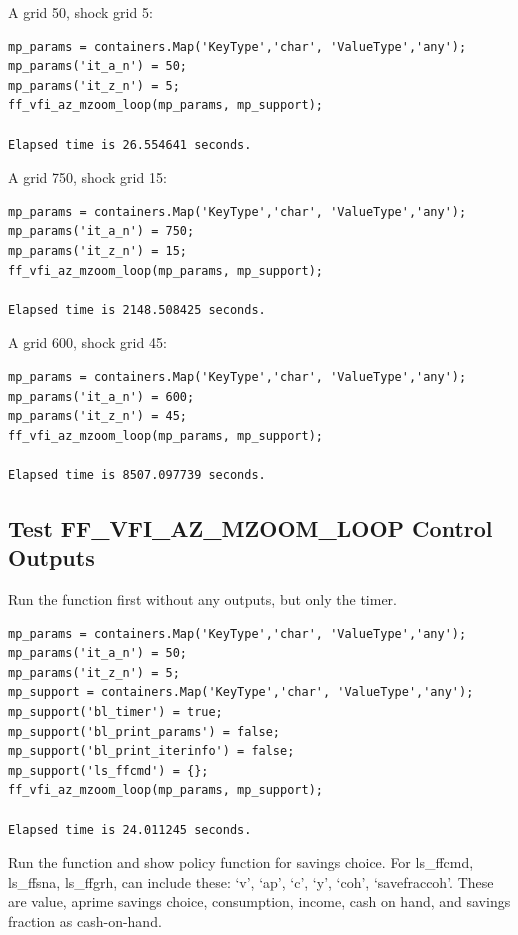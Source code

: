 \documentclass[
]{book}
\begin{document}
A grid 50, shock grid 5:

\begin{verbatim}
mp_params = containers.Map('KeyType','char', 'ValueType','any');
mp_params('it_a_n') = 50;
mp_params('it_z_n') = 5;
ff_vfi_az_mzoom_loop(mp_params, mp_support);

Elapsed time is 26.554641 seconds.
\end{verbatim}

A grid 750, shock grid 15:

\begin{verbatim}
mp_params = containers.Map('KeyType','char', 'ValueType','any');
mp_params('it_a_n') = 750;
mp_params('it_z_n') = 15;
ff_vfi_az_mzoom_loop(mp_params, mp_support);

Elapsed time is 2148.508425 seconds.
\end{verbatim}

A grid 600, shock grid 45:

\begin{verbatim}
mp_params = containers.Map('KeyType','char', 'ValueType','any');
mp_params('it_a_n') = 600;
mp_params('it_z_n') = 45;
ff_vfi_az_mzoom_loop(mp_params, mp_support);

Elapsed time is 8507.097739 seconds.
\end{verbatim}

\hypertarget{test-ff_vfi_az_mzoom_loop-control-outputs}{%
\subsection{Test FF\_VFI\_AZ\_MZOOM\_LOOP Control Outputs}\label{test-ff_vfi_az_mzoom_loop-control-outputs}}

Run the function first without any outputs, but only the timer.

\begin{verbatim}
mp_params = containers.Map('KeyType','char', 'ValueType','any');
mp_params('it_a_n') = 50;
mp_params('it_z_n') = 5;
mp_support = containers.Map('KeyType','char', 'ValueType','any');
mp_support('bl_timer') = true;
mp_support('bl_print_params') = false;
mp_support('bl_print_iterinfo') = false;
mp_support('ls_ffcmd') = {};
ff_vfi_az_mzoom_loop(mp_params, mp_support);

Elapsed time is 24.011245 seconds.
\end{verbatim}

Run the function and show policy function for savings choice. For
ls\_ffcmd, ls\_ffsna, ls\_ffgrh, can include these: `v', `ap', `c', `y',
`coh', `savefraccoh'. These are value, aprime savings choice,
consumption, income, cash on hand, and savings fraction as cash-on-hand.
\end{document}
